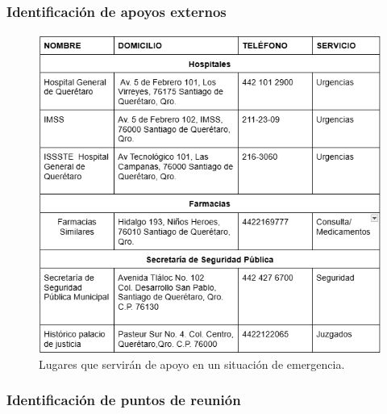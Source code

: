     \subsubsection{ Identificación de apoyos externos}
    
    \begin{figure}[H]
        \centering
        \includegraphics[scale=0.5]{35/Img/apoyosExternos.png}
        \caption{Lugares que servirán de apoyo en un situación de emergencia.}
    \end{figure}
    
    \subsubsection{Identificación de puntos de reunión}
    
